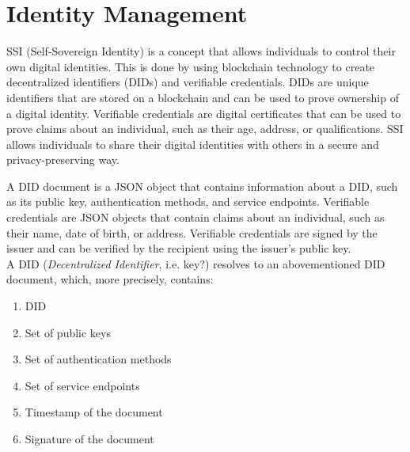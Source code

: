 \section{Identity Management}
SSI (Self-Sovereign Identity) is a concept that allows individuals to control their own digital identities. This is done by using blockchain technology to create decentralized identifiers (DIDs) and verifiable credentials. DIDs are unique identifiers that are stored on a blockchain and can be used to prove ownership of a digital identity. Verifiable credentials are digital certificates that can be used to prove claims about an individual, such as their age, address, or qualifications. SSI allows individuals to share their digital identities with others in a secure and privacy-preserving way.

A DID document is a JSON object that contains information about a DID, such as its public key, authentication methods, and service endpoints. Verifiable credentials are JSON objects that contain claims about an individual, such as their name, date of birth, or address. Verifiable credentials are signed by the issuer and can be verified by the recipient using the issuer's public key.\\
A DID (\textit{Decentralized Identifier}, i.e. key?) resolves to an abovementioned DID document, which, more precisely, contains:
\begin{enumerate}
   \item DID
   \item Set of public keys
   \item Set of authentication methods
   \item Set of service endpoints
   \item Timestamp of the document
   \item Signature of the document
\end{enumerate}